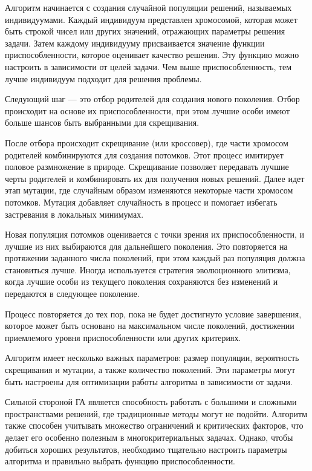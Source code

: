 Алгоритм начинается с создания случайной популяции решений, называемых индивидуумами. Каждый индивидуум представлен хромосомой, которая может быть строкой чисел или других значений, отражающих параметры решения задачи.
Затем каждому индивидууму присваивается значение функции приспособленности, которое оценивает качество решения. Эту функцию можно настроить в зависимости от целей задачи. Чем выше приспособленность, тем лучше индивидуум подходит для решения проблемы. 

Следующий шаг — это отбор родителей для создания нового поколения. Отбор происходит на основе их приспособленности, при этом лучшие особи имеют больше шансов быть выбранными для скрещивания.

После отбора происходит скрещивание (или кроссовер), где части хромосом родителей комбинируются для создания потомков. Этот процесс имитирует половое размножение в природе. Скрещивание позволяет передавать лучшие черты родителей и комбинировать их для получения новых решений. Далее идет этап мутации, где случайным образом изменяются некоторые части хромосом потомков. Мутация добавляет случайность в процесс и помогает избегать застревания в локальных минимумах.

Новая популяция потомков оценивается с точки зрения их приспособленности, и лучшие из них выбираются для дальнейшего поколения. Это повторяется на протяжении заданного числа поколений, при этом каждый раз популяция должна становиться лучше. Иногда используется стратегия эволюционного элитизма, когда лучшие особи из текущего поколения сохраняются без изменений и передаются в следующее поколение.

Процесс повторяется до тех пор, пока не будет достигнуто условие завершения, которое может быть основано на максимальном числе поколений, достижении приемлемого уровня приспособленности или других критериях. 

Алгоритм имеет несколько важных параметров: размер популяции, вероятность скрещивания и мутации, а также количество поколений. Эти параметры могут быть настроены для оптимизации работы алгоритма в зависимости от задачи. 

Сильной стороной ГА является способность работать с большими и сложными пространствами решений, где традиционные методы могут не подойти. Алгоритм также способен учитывать множество ограничений и критических факторов, что делает его особенно полезным в многокритериальных задачах. Однако, чтобы добиться хороших результатов, необходимо тщательно настроить параметры алгоритма и правильно выбрать функцию приспособленности.



